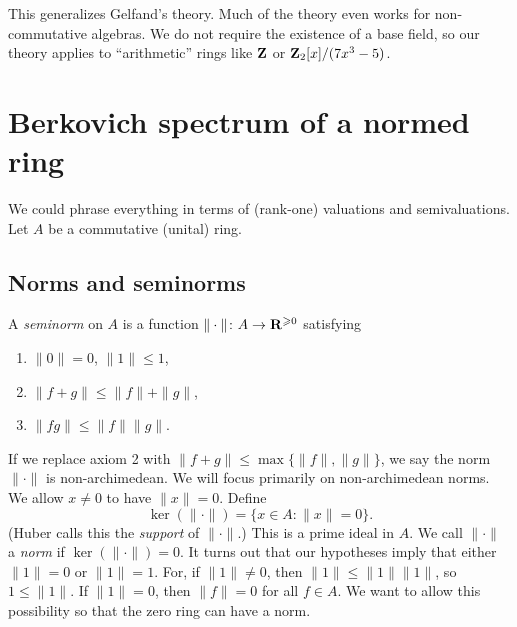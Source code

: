 

This generalizes Gelfand's theory. Much of the theory even works for 
non-commutative algebras. We do not require the existence of a base field, so 
our theory applies to ``arithmetic'' rings like $\mathbf{Z}$ or 
$\mathbf{Z}_2[x]/(7 x^3-5)$. 





\section{Berkovich spectrum of a normed ring}

We could phrase everything in terms of (rank-one) valuations and semivaluations.
Let $A$ be a commutative (unital) ring. 


\subsection{Norms and seminorms}

\begin{definition}
A \emph{seminorm} on $A$ is a function $\|\cdot\|\colon A\to \mathbf{R}^{\geqslant 0}$ 
satisfying 
\begin{enumerate}
\item
$\|0\|=0$, $\|1\|\leqslant 1$, 

\item
$\|f+g\|\leqslant \|f\|+\|g\|$, 

\item
$\|f g\| \leqslant \|f\| \|g\|$. 
\end{enumerate}
\end{definition}

If we replace axiom 2 with $\|f+g\| \leqslant \max\{\|f\|,\|g\|\}$, we say the 
norm $\|\cdot\|$ is non-archimedean. We will focus primarily on non-archimedean 
norms. We allow $x\ne 0$ to have $\|x\|=0$. Define 
\[
  \ker(\|\cdot\|) = \{x\in A\colon \|x\| = 0\} .
\]
(Huber calls this the \emph{support} of $\|\cdot\|$.) This is a prime ideal in 
$A$. We call $\|\cdot\|$ a \emph{norm} if $\ker(\|\cdot\|)=0$. It turns out 
that our hypotheses imply that either $\|1\|=0$ or $\|1\|=1$. For, if 
$\|1\|\ne 0$, then $\|1\| \leqslant \|1\|\|1\|$, so $1\leqslant \|1\|$. If 
$\|1\|=0$, then $\|f\|=0$ for all $f\in A$. We want to allow this possibility 
so that the zero ring can have a norm. 

